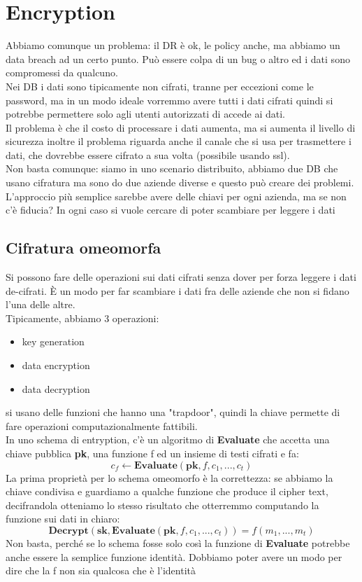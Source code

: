 \documentclass[12pt, oneside]{extbook} %
\begin{document}
\section{Encryption}
Abbiamo comunque un problema: il DR è ok, le policy anche, ma abbiamo un data breach ad un certo punto. Può essere colpa di un bug o altro ed i dati sono compromessi da qualcuno.\\Nei DB i dati sono tipicamente non cifrati, tranne per eccezioni come le password, ma in un modo ideale vorremmo avere tutti i dati cifrati quindi si potrebbe permettere solo agli utenti autorizzati di accede ai dati.\\Il problema è che il costo di processare i dati aumenta, ma si aumenta il livello di sicurezza inoltre il problema riguarda anche il canale che si usa per trasmettere i dati, che dovrebbe essere cifrato a sua volta (possibile usando ssl).\\Non basta comunque: siamo in uno scenario distribuito, abbiamo due DB che usano cifratura ma sono do due aziende diverse e questo può creare dei problemi. L'approccio più semplice sarebbe avere delle chiavi per ogni azienda, ma se non c'è fiducia? In ogni caso si vuole cercare di poter scambiare per leggere i dati
\subsection{Cifratura omeomorfa}
Si possono fare delle operazioni sui dati cifrati senza dover per forza leggere i dati de-cifrati. È un modo per far scambiare i dati fra delle aziende che non si fidano l'una delle altre.\\Tipicamente, abbiamo 3 operazioni:
\begin{itemize}
	\item key generation
	\item data encryption
	\item data decryption
\end{itemize}
si usano delle funzioni che hanno una "trapdoor", quindi la chiave permette di fare operazioni computazionalmente fattibili.\\In uno schema di entryption, c'è un algoritmo di \textbf{Evaluate} che accetta una chiave pubblica \textbf{pk}, una funzione f ed un insieme di testi cifrati e fa:
\begin{equation}
	c_f \leftarrow \textbf{Evaluate}(\textbf{pk}, f, c_1, ..., c_t)
\end{equation}
La prima proprietà per lo schema omeomorfo è la correttezza: se abbiamo la chiave condivisa e guardiamo a qualche funzione che produce il cipher text, decifrandola otteniamo lo stesso risultato che otterremmo computando la funzione sui dati in chiaro:
\begin{equation}
	\textbf{Decrypt}(\textbf{sk}, \textbf{Evaluate}(\textbf{pk}, f, c_1, ..., c_t)) = f(m_1, ..., m_t)
\end{equation}
Non basta, perché se lo schema fosse solo così la funzione di \textbf{Evaluate} potrebbe anche essere la semplice funzione identità. Dobbiamo poter avere un modo per dire che la f non sia qualcosa che è l'identità
\end{document}
